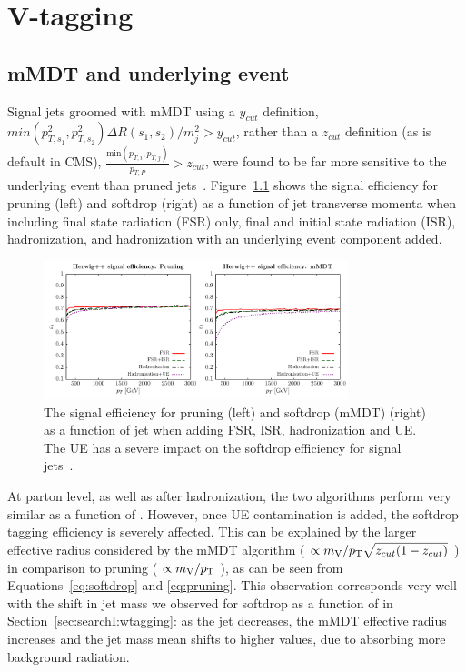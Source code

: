 \clearpage
\chapter{V-tagging}
\vspace*{\fill}\newpage
\label{app:vtag}
\section{mMDT and underlying event}
\label{app:sdue}
Signal jets groomed with mMDT using a $y_{cut}$ definition, $min(p^2_{T,s_1}, p^2_{T,s_2})\Delta R(s_1,s_2)/m^2_{j} > y_{cut}$, rather than a $z_{cut}$ definition (as is default in CMS), $\frac{ \textrm{min}(p_{T,i},p_{T,j}) }{ p_{T,P} } > z_{cut} $, were found to be far more sensitive to the underlying event than pruned jets~\cite{Dasgupta:2015yua}. Figure~\ref{fig:searchII:ue} shows the signal efficiency for pruning (left) and softdrop (right) as a function of jet transverse momenta when including final state radiation (FSR) only, final and initial state radiation (ISR), hadronization, and hadronization with an underlying event component added.
\begin{figure}[h!]
\centering
\includegraphics[width=0.79\textwidth]{figures/analysis/search2/misc/pruningvssd_ue.pdf}
\caption{The signal efficiency for pruning (left) and softdrop (mMDT) (right) as a function of jet \PT when adding FSR, ISR, hadronization and UE. The UE has a severe impact on the softdrop efficiency for signal jets~\cite{Dasgupta:2015yua}. }
\label{fig:searchII:ue}
\end{figure}
At parton level, as well as after hadronization, the two algorithms perform very similar as a function of \PT. However, once UE contamination is added, the softdrop tagging efficiency is severely affected. This can be explained by the larger effective radius considered by the mMDT algorithm ( $\propto m_{\mathrm{V}}/p_{\mathrm{T}} \sqrt{z_{cut}(1-z_{cut})}$ ) in comparison to pruning ( $\propto m_{\mathrm{V}}/p_{\mathrm{T}}$ ), as can be seen from Equations~\ref{eq:softdrop} and \ref{eq:pruning}. This observation corresponds very well with the shift in jet mass we observed for softdrop as a function of \PT in Section~\ref{sec:searchI:wtagging}: as the jet \PT decreases, the mMDT effective radius increases and the jet mass mean shifts to higher values, due to absorbing more background radiation.
\clearpage
